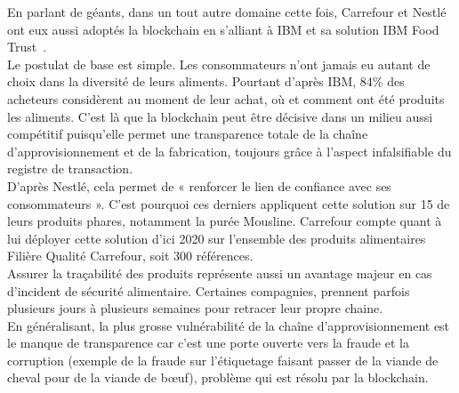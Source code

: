 \documentclass[12pt, a4paper, oneside]{book}
\begin{document}
    En parlant de géants, dans un tout autre domaine cette fois, Carrefour et Nestlé ont eux aussi adoptés la blockchain en s’alliant à IBM et sa solution IBM Food Trust~\cite{IBMfood}.
    \\
    Le postulat de base est simple. Les consommateurs n’ont jamais eu autant de choix dans la diversité de leurs aliments. Pourtant d’après IBM, 84\% des acheteurs considèrent au moment de leur achat, où et comment ont été produits les aliments. C’est là que la blockchain peut être décisive dans un milieu aussi compétitif puisqu'elle permet une transparence totale de la chaîne d’approvisionnement et de la fabrication, toujours grâce à l’aspect infalsifiable du registre de transaction.
    \\
    D’après Nestlé, cela permet de « renforcer le lien de confiance avec ses consommateurs ». C’est pourquoi ces derniers appliquent cette solution sur 15 de leurs produits phares, notamment la purée Mousline. Carrefour compte quant à lui déployer cette solution d’ici 2020 sur l’ensemble des produits alimentaires Filière Qualité Carrefour, soit 300 références.
    \\
    Assurer la traçabilité des produits représente aussi un avantage majeur en cas d’incident de sécurité alimentaire. Certaines compagnies, prennent parfois plusieurs jours à plusieurs semaines pour retracer leur propre chaine.
    \\
    En généralisant, la plus grosse vulnérabilité de la chaîne d’approvisionnement est le manque de transparence car c'est une porte ouverte vers la fraude et la corruption (exemple de la fraude sur l’étiquetage faisant passer de la viande de cheval pour de la viande de bœuf), problème qui est résolu par la blockchain.
\end{document}
